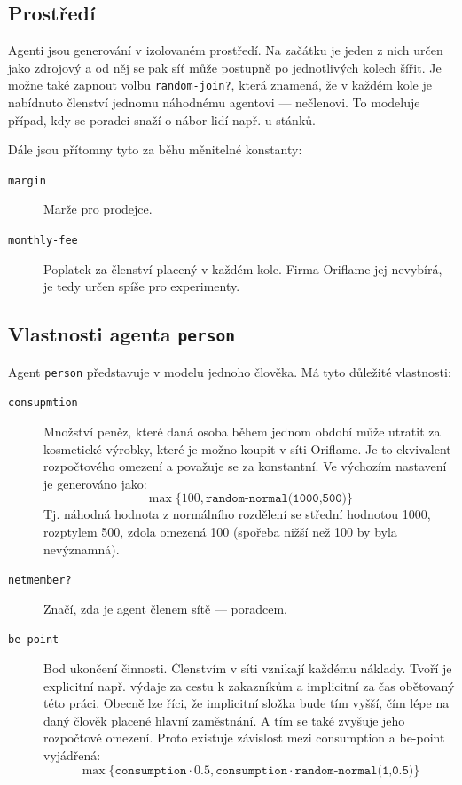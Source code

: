 \documentclass[a4wide,12pt]{report}
\begin{document}
\subsection{Prostředí}
Agenti jsou generování v izolovaném prostředí. Na začátku je jeden z nich určen jako zdrojový a od něj se pak síť může postupně po jednotlivých kolech šířit. Je možne také zapnout volbu \texttt{random-join?}, která znamená, že v každém kole je nabídnuto členství jednomu náhodnému agentovi --- nečlenovi. To modeluje případ, kdy se poradci snaží o nábor lidí např. u stánků.

Dále jsou přítomny tyto za běhu měnitelné konstanty:
\begin{description}
\item[\texttt{margin}] Marže pro prodejce.
\item[\texttt{monthly-fee}] Poplatek za členství placený v každém kole. Firma Oriflame jej nevybírá, je tedy určen spíše pro experimenty.
\end{description}
\subsection{Vlastnosti agenta \texttt{person}}
\label{sec:vl_agenta}
Agent \texttt{person} představuje v modelu jednoho člověka. Má tyto důležité vlastnosti:
\begin{description}
\item[\texttt{consupmtion}] Množství peněz, které daná osoba během jednom období může utratit za kosmetické výrobky, které je možno koupit v síti Oriflame. Je to ekvivalent rozpočtového omezení a považuje se za konstantní. Ve výchozím nastavení je generováno jako:
$$\max\{100,\texttt{random-normal(1000,500)}\}$$
Tj. náhodná hodnota z normálního rozdělení se střední hodnotou 1000, rozptylem 500, zdola omezená 100 (spořeba nižší než 100 by byla nevýznamná).
\item[\texttt{netmember?}] Značí, zda je agent členem sítě --- poradcem.
\item[\texttt{be-point}] Bod ukončení činnosti. Členstvím v síti vznikají každému náklady. Tvoří je explicitní např. výdaje za cestu k zakazníkům a implicitní za čas obětovaný této práci. Obecně lze říci, že implicitní složka bude tím vyšší, čím lépe na daný člověk placené hlavní zaměstnání. A tím se také zvyšuje jeho rozpočtové omezení. Proto existuje závislost mezi consumption a be-point vyjádřená:
$$\max\{\texttt{consumption}\cdot 0.5,\texttt{consumption}\cdot\texttt{random-normal(1,0.5)}\}$$
\end{description}
\end{document}
